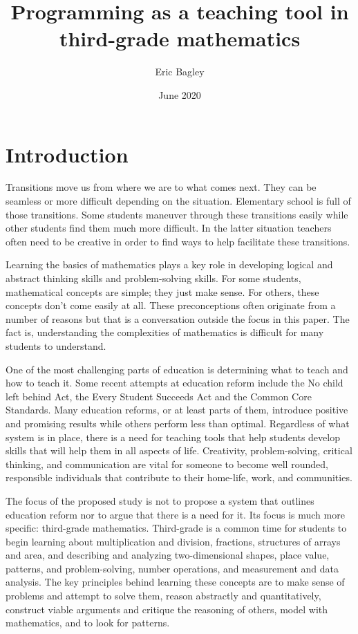 \documentclass[12pt]{article}
\title{Programming as a teaching tool in third-grade mathematics }
\author{Eric Bagley}
\date{June 2020}
\begin{document}
\maketitle

\section*{Introduction}

Transitions move us from where we are to what comes next.
They can be seamless or more difficult depending on the situation.
Elementary school is full of those transitions.
Some students maneuver through these transitions easily while other students find them much more difficult. 
In the latter situation teachers often need to be creative in order to find ways to help facilitate these transitions.

Learning the basics of mathematics plays a key role in developing logical and abstract thinking skills and problem-solving skills.
For some students, mathematical concepts are simple; they just make sense.
For others, these concepts don’t come easily at all.
These preconceptions often originate from a number of reasons but that is a conversation outside the focus in this paper.
The fact is, understanding the complexities of mathematics is difficult for many students to understand.

One of the most challenging parts of education is determining what to teach and how to teach it.
Some recent attempts at education reform include the No child left behind Act,  the Every Student Succeeds Act and the Common Core Standards.
Many education reforms, or at least parts of them, introduce positive and promising results while others perform less than optimal.
Regardless of what system is in place, there is a need for teaching tools that help students develop skills that will help them in all aspects of life.
Creativity, problem-solving, critical thinking, and communication are vital for someone to become well rounded, responsible individuals that contribute to their home-life, work, and communities.

The focus of the proposed study is not to propose a system that outlines education reform nor to argue that there is a need for it.
Its focus is much more specific: third-grade mathematics.
Third-grade is a common time for students to begin learning about multiplication and division, fractions, structures of arrays and area, and describing and analyzing two-dimensional shapes, place value, patterns, and problem-solving, number operations, and measurement and data analysis.
The key principles behind learning these concepts are to make sense of problems and attempt to solve them, reason abstractly and quantitatively, construct viable arguments and critique the reasoning of others, model with mathematics, and to look for patterns.
\end{document}
